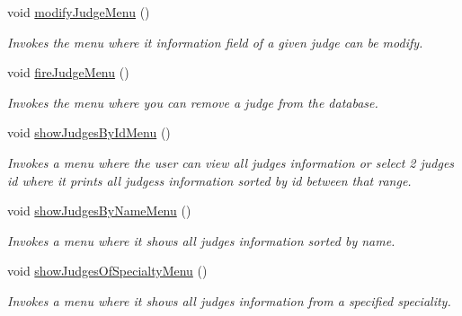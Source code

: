 \begin{DoxyCompactItemize}
\mbox{\label{class_company_m_s_a1a46d464fa43376a19be1e7135384df3}} 
void \hyperlink{class_company_m_s_a1a46d464fa43376a19be1e7135384df3}{modify\+Judge\+Menu} ()
\begin{DoxyCompactList}\small\item\em Invokes the menu where it information field of a given judge can be modify. \end{DoxyCompactList}\item 
\mbox{\label{class_company_m_s_a767abe30cdc7caff9edadbfd54b23f11}} 
void \hyperlink{class_company_m_s_a767abe30cdc7caff9edadbfd54b23f11}{fire\+Judge\+Menu} ()
\begin{DoxyCompactList}\small\item\em Invokes the menu where you can remove a judge from the database. \end{DoxyCompactList}\item 
\mbox{\label{class_company_m_s_a94c095863c758f0dd8ccb4ad24dd29d7}} 
void \hyperlink{class_company_m_s_a94c095863c758f0dd8ccb4ad24dd29d7}{show\+Judges\+By\+Id\+Menu} ()
\begin{DoxyCompactList}\small\item\em Invokes a menu where the user can view all judges\textquotesingle{} information or select 2 judges id where it prints all judges\textquotesingle{}s information sorted by id between that range. \end{DoxyCompactList}\item 
\mbox{\label{class_company_m_s_a544872476bc15cce6101e86a1cb10e2b}} 
void \hyperlink{class_company_m_s_a544872476bc15cce6101e86a1cb10e2b}{show\+Judges\+By\+Name\+Menu} ()
\begin{DoxyCompactList}\small\item\em Invokes a menu where it shows all judges\textquotesingle{} information sorted by name. \end{DoxyCompactList}\item 
\mbox{\label{class_company_m_s_a0cef369c35a5421fe3d256a48664d72a}} 
void \hyperlink{class_company_m_s_a0cef369c35a5421fe3d256a48664d72a}{show\+Judges\+Of\+Specialty\+Menu} ()
\begin{DoxyCompactList}\small\item\em Invokes a menu where it shows all judges\textquotesingle{} information from a specified speciality. \end{DoxyCompactList}\item 

\end{DoxyCompactItemize}
